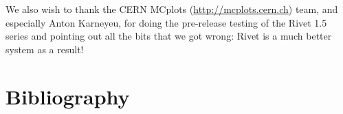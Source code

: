 \documentclass{JHEP3}
\begin{document}
We also wish to thank the CERN MCplots (\url{http://mcplots.cern.ch}) team, and
especially Anton Karneyeu, for doing the pre-release testing of the Rivet 1.5
series and pointing out all the bits that we got wrong: Rivet is a much better
system as a result!


\cleardoublepage

\part{Bibliography}

{\raggedright
  
}
\end{document}
